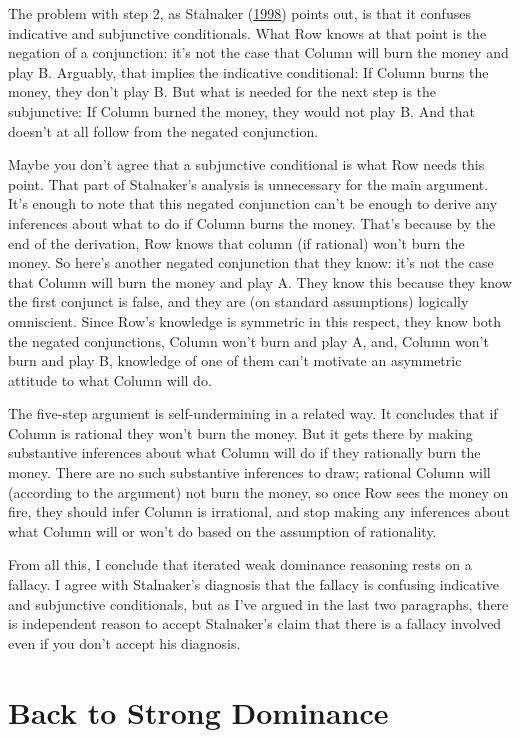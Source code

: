 \documentclass[
  12pt,
  letterpaper,
  DIV=11,
  numbers=noendperiod]{scrreprt}
\begin{document}
The problem with step 2, as Stalnaker
(\protect\hyperlink{ref-Stalnaker1998}{1998}) points out, is that it
confuses indicative and subjunctive conditionals. What Row knows at that
point is the negation of a conjunction: it's not the case that Column
will burn the money and play B. Arguably, that implies the indicative
conditional: If Column burns the money, they don't play B. But what is
needed for the next step is the subjunctive: If Column burned the money,
they would not play B. And that doesn't at all follow from the negated
conjunction.

Maybe you don't agree that a subjunctive conditional is what Row needs
this point. That part of Stalnaker's analysis is unnecessary for the
main argument. It's enough to note that this negated conjunction can't
be enough to derive any inferences about what to do if Column burns the
money. That's because by the end of the derivation, Row knows that
column (if rational) won't burn the money. So here's another negated
conjunction that they know: it's not the case that Column will burn the
money and play A. They know this because they know the first conjunct is
false, and they are (on standard assumptions) logically omniscient.
Since Row's knowledge is symmetric in this respect, they know both the
negated conjunctions, Column won't burn and play A, and, Column won't
burn and play B, knowledge of one of them can't motivate an asymmetric
attitude to what Column will do.

The five-step argument is self-undermining in a related way. It
concludes that if Column is rational they won't burn the money. But it
gets there by making substantive inferences about what Column will do if
they rationally burn the money. There are no such substantive inferences
to draw; rational Column will (according to the argument) not burn the
money, so once Row sees the money on fire, they should infer Column is
irrational, and stop making any inferences about what Column will or
won't do based on the assumption of rationality.

From all this, I conclude that iterated weak dominance reasoning rests
on a fallacy. I agree with Stalnaker's diagnosis that the fallacy is
confusing indicative and subjunctive conditionals, but as I've argued in
the last two paragraphs, there is independent reason to accept
Stalnaker's claim that there is a fallacy involved even if you don't
accept his diagnosis.

\hypertarget{sec-weak-strong}{%
\section{Back to Strong Dominance}\label{sec-weak-strong}}
\end{document}
